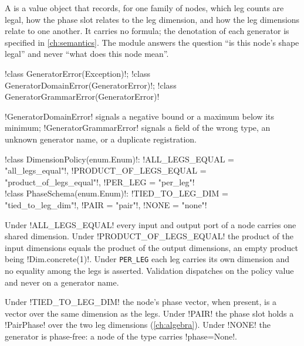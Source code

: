 A  is a value object that records, for one family of nodes, which leg counts are legal, how the phase slot relates to the leg dimension, and how the leg dimensions relate to one another. It carries no formula; the denotation of each generator is specified in \cref{ch:semantics}. The module answers the question \enquote{is this node's shape legal} and never \enquote{what does this node mean}.

\begin{signature}
\py!class GeneratorError(Exception)!; \py!class GeneratorDomainError(GeneratorError)!; \py!class GeneratorGrammarError(GeneratorError)!
\end{signature}

\py!GeneratorDomainError! signals a negative bound or a maximum below its minimum; \py!GeneratorGrammarError! signals a field of the wrong type, an unknown generator name, or a duplicate registration.

\begin{signature}
\py!class DimensionPolicy(enum.Enum)!: \py!ALL_LEGS_EQUAL = "all_legs_equal"!, \py!PRODUCT_OF_LEGS_EQUAL = "product_of_legs_equal"!, \py!PER_LEG = "per_leg"!\\
\py!class PhaseSchema(enum.Enum)!: \py!TIED_TO_LEG_DIM = "tied_to_leg_dim"!, \py!PAIR = "pair"!, \py!NONE = "none"!
\end{signature}

\begin{definition}\label{def:diagrams-dim-policy}
Under \code!ALL_LEGS_EQUAL! every input and output port of a node carries one shared dimension. Under \code!PRODUCT_OF_LEGS_EQUAL! the product of the input dimensions equals the product of the output dimensions, an empty product being \py!Dim.concrete(1)!. Under \texttt{PER\_LEG} each leg carries its own dimension and no equality among the legs is asserted. Validation dispatches on the policy value and never on a generator name.
\end{definition}

\begin{definition}\label{def:diagrams-phase-schema}
Under \code!TIED_TO_LEG_DIM! the node's phase vector, when present, is a vector over the same dimension as the legs. Under \code!PAIR! the phase slot holds a \py!PairPhase! over the two leg dimensions (\cref{ch:algebra}). Under \code!NONE! the generator is phase-free: a node of the type carries \py!phase=None!.
\end{definition}

